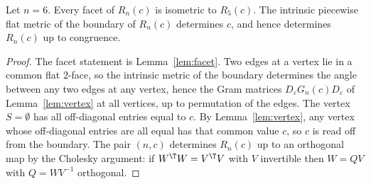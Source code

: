 \begin{theorem}\label{thm:main}
Let $n=6$. Every facet of $R_n(c)$ is isometric to $R_{5}(c)$.
The intrinsic piecewise flat metric of the boundary of $R_n(c)$ determines $c$, and hence determines $R_n(c)$ up to congruence.
\end{theorem}
\begin{proof}
The facet statement is Lemma~\ref{lem:facet}.
Two edges at a vertex lie in a common flat $2$-face, so the intrinsic metric of the boundary determines the angle between any two edges at any vertex, hence the Gram matrices $D_\varepsilon G_n(c)D_\varepsilon$ of Lemma~\ref{lem:vertex} at all vertices, up to permutation of the edges. The vertex $S=\emptyset$ has all off-diagonal entries equal to $c$. By Lemma~\ref{lem:vertex}, any vertex whose off-diagonal entries are all equal has that common value $c$, so $c$ is read off from the boundary. The pair $(n,c)$ determines $R_n(c)$ up to an orthogonal map by the Cholesky argument: if $W^\T W=V^\T V$ with $V$ invertible then $W=QV$ with $Q=WV^{-1}$ orthogonal.
\end{proof}

